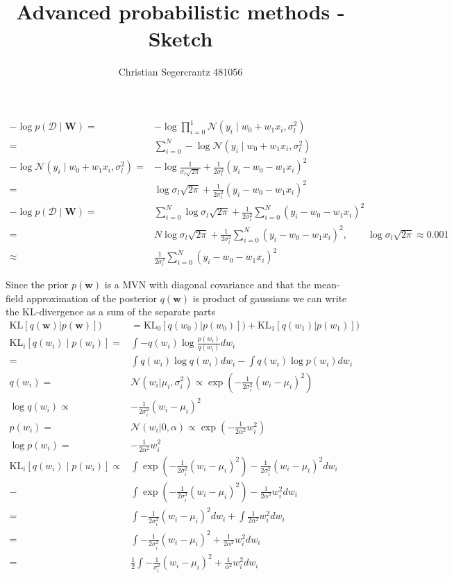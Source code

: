 \documentclass{article}
\title{Advanced probabilistic methods - Sketch}
\author{Christian Segercrantz 481056}
\begin{document}
	\maketitle
	\pagebreak
\begin{align}
	-\log p(\mathcal{D}\mid \mathbf{W}) =& -\log\prod_{i=0}^1 \mathcal{N}(y_i\mid w_0 + w_1x_i, \sigma_l^2) \\
	=& \sum_{i=0}^N-\log \mathcal{N}(y_i\mid w_0 + w_1x_i, \sigma_l^2)\\
	-\log \mathcal{N}(y_i\mid w_0 + w_1x_i, \sigma_l^2) =& -\log\frac{1}{\sigma_l \sqrt{2\pi}} +\frac{1}{2\sigma_l^2}(y_i -w_0-w_1x_i)^2\\
	=& \log\sigma_l \sqrt{2\pi} +\frac{1}{2\sigma_l^2}(y_i -w_0-w_1x_i)^2\\
	-\log p(\mathcal{D}\mid \mathbf{W}) =& \sum_{i=0}^N\log\sigma_l \sqrt{2\pi} +\frac{1}{2\sigma_l^2}\sum_{i=0}^N(y_i -w_0-w_1x_i)^2 \\
	=& N\log\sigma_l \sqrt{2\pi} +\frac{1}{2\sigma_l^2}\sum_{i=0}^N(y_i -w_0-w_1x_i)^2, \qquad \log \sigma_l\sqrt{2\pi} \approx 0.001\\
	\approx & \frac{1}{2\sigma_l^2}\sum_{i=0}^N(y_i -w_0-w_1x_i)^2 
\end{align}

Since the prior $p(\mathbf{w})$ is a MVN with diagonal covariance and that the mean-field approximation of the posterior $q(\mathbf{w})$ is product of gaussians we can write the KL-divergence as a sum of the separate parts
\begin{align}
	\text{KL}\left[q(\mathbf{w})| p(\mathbf{w})\right]) &= \text{KL}_0\left[q(w_0)| p(w_0)\right]) + \text{KL}_1\left[q(w_1)| p(w_1)\right]) \\
	\text{KL}_i[q(w_i)\mid p(w_i)] =& \int -q(w_i) \log\frac{p(w_i)}{q(w_i)} dw_i \\
	=& \int q(w_i) \log q(w_i) dw_i - \int q(w_i) \log p(w_i) dw_i \\
	q(w_i) =& \mathcal{N}(w_i | \mu_i,\sigma_i^2) \propto \exp(-\frac{1}{2\sigma_i^2}(w_i-\mu_i)^2) \\
	\log q(w_i) \propto& -\frac{1}{2\sigma_i^2}(w_i-\mu_i)^2 \\
	p(w_i) =& \mathcal{N}(w_i | 0,\alpha) \propto \exp(-\frac{1}{2\alpha^2}w_i^2)\\
	\log p(w_i) =& -\frac{1}{2\alpha^2}w_i^2 \\
	\text{KL}_i[q(w_i)\mid p(w_i)] \propto& \int \exp(-\frac{1}{2\sigma_i^2}(w_i-\mu_i)^2)  -\frac{1}{2\sigma_i^2}(w_i-\mu_i)^2 dw_i \\-& \int \exp(-\frac{1}{2\sigma_i^2}(w_i-\mu_i)^2) -\frac{1}{2\alpha^2}w_i^2 dw_i \\
	=& \int -\frac{1}{2\sigma_i^2}(w_i-\mu_i)^2 dw_i  +\int  \frac{1}{2\alpha^2}w_i^2 dw_i \\
	=& \int -\frac{1}{2\sigma_i^2}(w_i-\mu_i)^2  +  \frac{1}{2\alpha^2}w_i^2 dw_i \\
	=& \frac{1}{2}\int -\frac{1}{\sigma_i^2}(w_i-\mu_i)^2  +  \frac{1}{\alpha^2}w_i^2 dw_i \\
\end{align}
\end{document}
